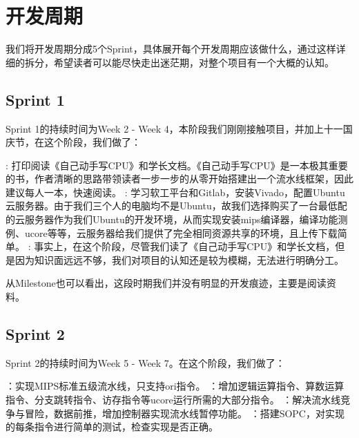 \chapter{开发周期}

我们将开发周期分成5个Sprint，具体展开每个开发周期应该做什么，通过这样详细的拆分，希望读者可以能尽快走出迷茫期，对整个项目有一个大概的认知。

\section{Sprint 1}

Sprint 1的持续时间为Week 2 - Week 4，本阶段我们刚刚接触项目，并加上十一国庆节，在这个阶段，我们做了：

    \begin{enumerate}
        : 打印阅读《自己动手写CPU》和学长文档。《自己动手写CPU》是一本极其重要的书，作者清晰的思路带领读者一步一步的从零开始搭建出一个流水线框架，因此建议每人一本，快速阅读。
        : 学习软工平台和Gitlab，安装Vivado，配置Ubuntu云服务器。由于我们三个人的电脑均不是Ubuntu，故我们选择购买了一台最低配的云服务器作为我们Ubuntu的开发环境，从而实现安装mips编译器，编译功能测例、ucore等等，云服务器给我们提供了完全相同资源共享的环境，且上传下载简单。
        : 事实上，在这个阶段，尽管我们读了《自己动手写CPU》和学长文档，但是因为知识面远远不够，我们对项目的认知还是较为模糊，无法进行明确分工。
    \end{enumerate}


从Milestone也可以看出，这段时期我们并没有明显的开发痕迹，主要是阅读资料。

\section{Sprint 2}

Sprint 2的持续时间为Week 5 - Week 7。在这个阶段，我们做了：

    \begin{enumerate}
        ：实现MIPS标准五级流水线，只支持ori指令。
        ：增加逻辑运算指令、算数运算指令、分支跳转指令、访存指令等ucore运行所需的大部分指令。
        ：解决流水线竞争与冒险，数据前推，增加控制器实现流水线暂停功能。
        ：搭建SOPC，对实现的每条指令进行简单的测试，检查实现是否正确。
    \end{enumerate}

